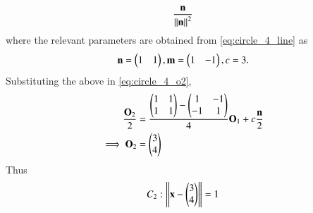 \documentclass[journal,12pt,twocolumn]{IEEEtran}
\begin{document}
\begin{enumerate}[label=\arabic*]
\begin{align}
\frac{\mathbf{n}}{\left\Vert\mathbf{n}\right\Vert^2}
\end{align}
%
where the relevant parameters are obtained from \eqref{eq:circle_4_line} as
\begin{align}
\mathbf{n} =  \begin{pmatrix}1 & 1\end{pmatrix}, \mathbf{m} =  \begin{pmatrix}1 & -1\end{pmatrix}, c = 3.
\end{align}
%
Substituting the above in \eqref{eq:circle_4_o2},
\begin{align}
\label{eq:circle_4_o2_final}
\frac{\mathbf{O}_2}{2} &= \frac{\begin{pmatrix}1 & 1 \\ 1 & 1\end{pmatrix}-\begin{pmatrix}1 & -1 \\ -1 & 1\end{pmatrix}}{4}\mathbf{O}_1 + c 
\frac{\mathbf{n}}{2}
\nonumber \\
\implies \mathbf{O}_2 &= \begin{pmatrix}3 \\ 4\end{pmatrix}
\end{align}
%
Thus
\begin{align}
C_2: \left\Vert\mathbf{x}- \begin{pmatrix}3 \\ 4\end{pmatrix}\right\Vert = 1
\label{eq:circle_4_c2}
\end{align}


\end{enumerate}
\end{document}
